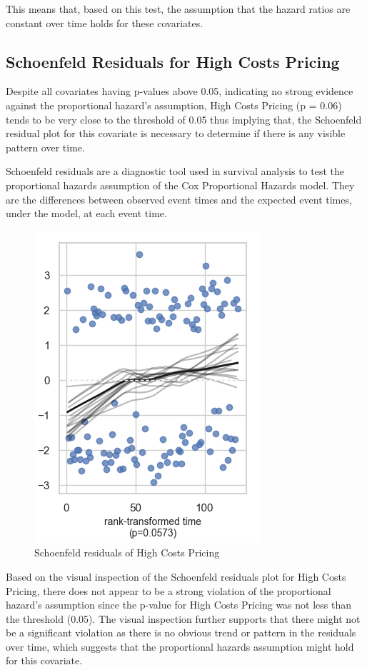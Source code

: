 \documentclass[doublespacing]{report} %
\begin{document}
This means that, based on this test, the assumption that the hazard ratios are constant over time holds for these covariates.

\subsection{Schoenfeld Residuals for High Costs Pricing}

Despite all covariates having p-values above 0.05, indicating no strong evidence against the proportional hazard’s assumption, High Costs Pricing (p = 0.06) tends to be very close to the threshold of 0.05 thus implying that, the Schoenfeld residual plot for this covariate is necessary to determine if there is any visible pattern over time. 

Schoenfeld residuals are a diagnostic tool used in survival analysis to test the proportional hazards assumption of the Cox Proportional Hazards model. They are the differences between observed event times and the expected event times, under the model, at each event time.

\begin{figure}[H]
    \centering
    \includegraphics[width=0.4\linewidth]{Figure 4/4.3.png}
    \caption{Schoenfeld residuals of High Costs Pricing}
    \label{Figure 4.3}
\end{figure}

Based on the visual inspection of the Schoenfeld residuals plot for High Costs Pricing, there does not appear to be a strong violation of the proportional hazard’s assumption since the p-value for High Costs Pricing was not less than the threshold (0.05). The visual inspection further supports that there might not be a significant violation as there is no obvious trend or pattern in the residuals over time, which suggests that the proportional hazards assumption might hold for this covariate.
\end{document}
